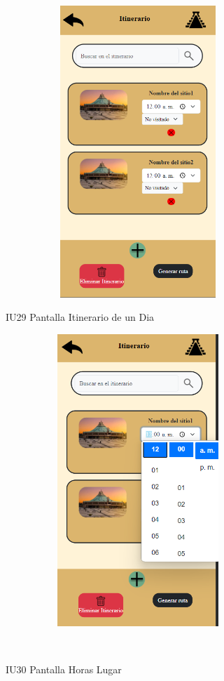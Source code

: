 \begin{figure}[htb]
    \begin{minipage}{1\textwidth}
    \centering
    \includegraphics[width=10cm, height=11cm]{entregable final/pantallasSistema/IU29 Pantalla Itinerario de un Dia.png}
    \caption{IU29 Pantalla Itinerario de un Dia}
\end{minipage}

    \begin{minipage}{1\textwidth}
        \centering
        \includegraphics[width=10cm, height=11cm]{entregable final/pantallasSistema/IU30 Pantalla Horas Lugar.png}
        \caption{IU30 Pantalla Horas Lugar}
    \end{minipage}
    \\
\end{figure}
